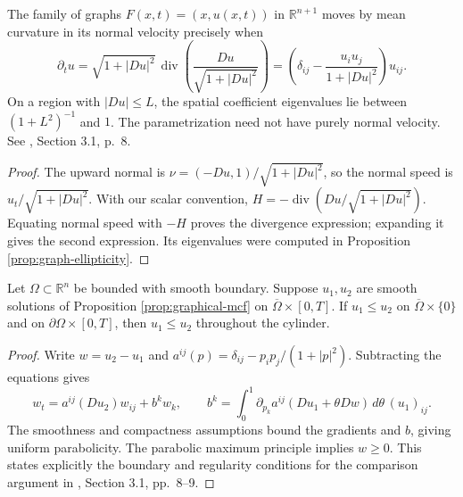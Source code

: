 \begin{proposition}\label{prop:graphical-mcf}
The family of graphs $F(x,t)=(x,u(x,t))$ in $\mathbb R^{n+1}$ moves by mean curvature in its normal velocity precisely when
\[
 \partial_tu=\sqrt{1+|Du|^2}\,\operatorname{div}\left(\frac{Du}{\sqrt{1+|Du|^2}}\right)
 =\left(\delta_{ij}-\frac{u_i u_j}{1+|Du|^2}\right)u_{ij}.
\]
On a region with $|Du|\leq L$, the spatial coefficient eigenvalues lie between $(1+L^2)^{-1}$ and $1$. The parametrization need not have purely normal velocity. See \cite{WhiMCF15}, Section 3.1, p.~8.
\end{proposition}
\begin{proof}
The upward normal is $\nu=(-Du,1)/\sqrt{1+|Du|^2}$, so the normal speed is $u_t/\sqrt{1+|Du|^2}$. With our scalar convention, $H=-\operatorname{div}(Du/\sqrt{1+|Du|^2})$. Equating normal speed with $-H$ proves the divergence expression; expanding it gives the second expression. Its eigenvalues were computed in Proposition \ref{prop:graph-ellipticity}.
\end{proof}

\begin{proposition}\label{prop:graphical-mcf-comparison}
Let $\Omega\subset\mathbb R^n$ be bounded with smooth boundary. Suppose $u_1,u_2$ are smooth solutions of Proposition \ref{prop:graphical-mcf} on $\overline\Omega\times[0,T]$. If $u_1\leq u_2$ on $\overline\Omega\times\{0\}$ and on $\partial\Omega\times[0,T]$, then $u_1\leq u_2$ throughout the cylinder.
\end{proposition}
\begin{proof}
Write $w=u_2-u_1$ and $a^{ij}(p)=\delta_{ij}-p_ip_j/(1+|p|^2)$. Subtracting the equations gives
\[
 w_t=a^{ij}(Du_2)w_{ij}+b^kw_k,
 \qquad b^k=\int_0^1\partial_{p_k}a^{ij}(Du_1+\theta Dw)\,d\theta\,(u_1)_{ij}.
\]
The smoothness and compactness assumptions bound the gradients and $b$, giving uniform parabolicity. The parabolic maximum principle implies $w\geq0$. This states explicitly the boundary and regularity conditions for the comparison argument in \cite{WhiMCF15}, Section 3.1, pp.~8--9.
\end{proof}
